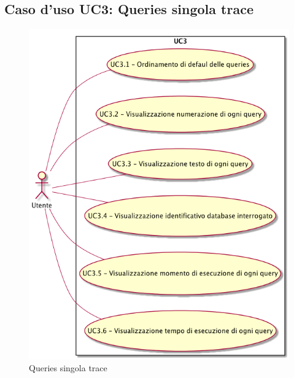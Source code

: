 \subsection{Caso d'uso UC3: Queries singola trace}
\begin{figure} [H]
\centering
\includegraphics[scale=0.45]{./UC/UC3.png}
\caption{Queries singola trace}\label{}
\end{figure}
